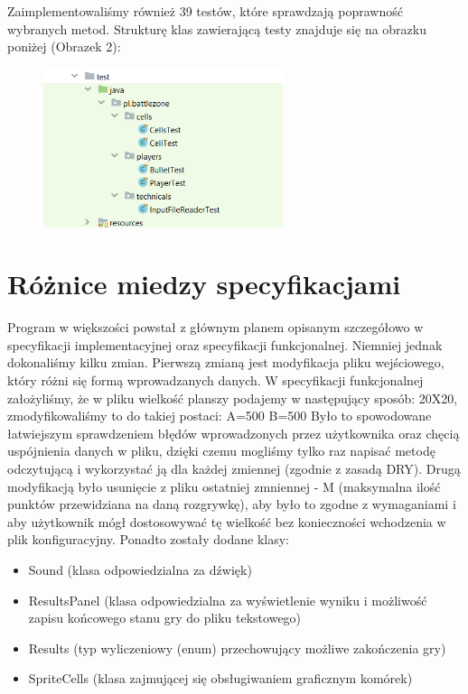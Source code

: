 \documentclass{article}
\begin{document}
Zaimplementowaliśmy również 39 testów, które sprawdzają poprawność wybranych metod. Strukturę klas zawierającą testy znajduje się na obrazku poniżej (Obrazek 2):

\begin{figure} [hbt!]
    \centering
    \includegraphics[width=7cm]{Struktura_testow.png}
\end{figure}


\section{Różnice miedzy specyfikacjami}
Program w większości powstał z głównym planem opisanym szczegółowo w specyfikacji implementacyjnej oraz specyfikacji funkcjonalnej.
Niemniej jednak dokonaliśmy kilku zmian.
\newline Pierwszą zmianą jest modyfikacja pliku wejściowego, który różni się formą wprowadzanych danych. W specyfikacji funkcjonalnej założyliśmy, że w pliku wielkość planszy podajemy w następujący sposób:
20X20, zmodyfikowaliśmy to do takiej postaci:
\newline A=500
\newline B=500
\newline Było to spowodowane łatwiejszym sprawdzeniem błędów wprowadzonych przez użytkownika oraz chęcią uspójnienia danych w pliku, dzięki czemu mogliśmy tylko raz napisać metodę odczytującą i wykorzystać ją dla każdej zmiennej (zgodnie z zasadą DRY).
Drugą modyfikacją było usunięcie z pliku ostatniej zmniennej - M (maksymalna ilość punktów przewidziana na daną rozgrywkę), aby było to zgodne z wymaganiami i aby użytkownik mógł dostosowywać tę wielkość bez konieczności wchodzenia w plik konfiguracyjny.
\newline Ponadto zostały dodane klasy: 
\begin{itemize}
\item Sound (klasa odpowiedzialna za dźwięk) 
\item ResultsPanel (klasa odpowiedzialna za wyświetlenie wyniku i możliwość zapisu końcowego stanu gry do pliku tekstowego)
\item Results (typ wyliczeniowy (enum) przechowujący możliwe zakończenia gry)
\item SpriteCells (klasa zajmującej się obsługiwaniem graficznym komórek)
\end{itemize}
\end{document}

